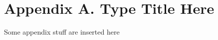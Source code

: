 \clearpage
{}
{}
\part*{Appendix A. Type Title Here}
\thispagestyle{empty} %
Some appendix stuff are inserted here